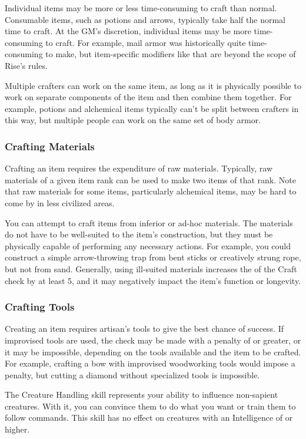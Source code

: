       Individual items may be more or less time-consuming to craft than normal.
      Consumable items, such as potions and arrows, typically take half the normal time to craft.
      At the GM's discretion, individual items may be more time-consuming to craft.
      For example, mail armor was historically quite time-consuming to make, but item-specific modifiers like that are beyond the scope of Rise's rules.

      Multiple crafters can work on the same item, as long as it is physically possible to work on separate components of the item and then combine them together.
      For example, potions and alchemical items typically can't be split between crafters in this way, but multiple people can work on the same set of body armor.

    \subsubsection{Crafting Materials}
      Crafting an item requires the expenditure of raw materials.
      Typically, raw materials of a given item rank can be used to make two items of that rank.
      Note that raw materials for some items, particularly alchemical items, may be hard to come by in less civilized areas.

      You can attempt to craft items from inferior or ad-hoc materials.
      The materials do not have to be well-suited to the item's construction, but they must be physically capable of performing any necessary actions.
      For example, you could construct a simple arrow-throwing trap from bent sticks or creatively strung rope, but not from sand.
      Generally, using ill-suited materials increases the  of the Craft check by at least 5, and it may negatively impact the item's function or longevity.

    \subsubsection{Crafting Tools}
      Creating an item requires artisan's tools to give the best chance of success.
      If improvised tools are used, the check may be made with a penalty of  or greater, or it may be impossible, depending on the tools available and the item to be crafted.
      For example, crafting a bow with improvised woodworking tools would impose a  penalty, but cutting a diamond without specialized tools is impossible.

\newpage
{}
  The Creature Handling skill represents your ability to influence non-sapient creatures.
  With it, you can convince them to do what you want or train them to follow commands.
  This skill has no effect on creatures with an Intelligence of  or higher.

